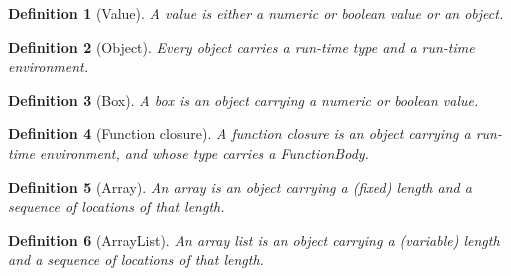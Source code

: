 \makeatletter{}\documentclass[10pt,oneside]{book}
\newcommand{\nonterminal}[1]{{\slantsf #1}}
\theoremstyle{note}
\newtheorem{definition}{Definition}[section]
\begin{document}
\begin{definition}[Value]
  A \emph{value} is either a numeric or boolean value or an \emph{object}.
\end{definition}

\begin{definition}[Object]
  Every object carries a run-time type and a run-time environment.
\end{definition}

\begin{definition}[Box]
  A box is an object carrying a numeric or boolean value.
\end{definition}


\begin{definition}[Function closure]
  A function closure is an object carrying a run-time environment,
  and whose type carries a 
  \nonterminal{FunctionBody}.
\end{definition}






\begin{definition}[Array]
  An array is an object carrying a (fixed) length and a sequence of locations of that length.
\end{definition}

\begin{definition}[ArrayList]
  An array list is an object carrying a (variable) length and a sequence of locations of that length.
\end{definition}
\end{document}
